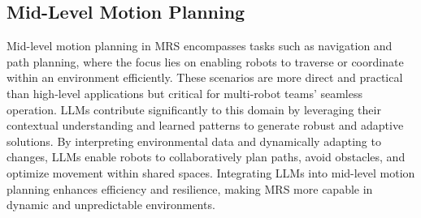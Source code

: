 \subsection{Mid-Level Motion Planning}
Mid-level motion planning in MRS encompasses tasks such as navigation and path planning, where the focus lies on enabling robots to traverse or coordinate within an environment efficiently. These scenarios are more direct and practical than high-level applications but critical for multi-robot teams' seamless operation. LLMs contribute significantly to this domain by leveraging their contextual understanding and learned patterns to generate robust and adaptive solutions. By interpreting environmental data and dynamically adapting to changes, LLMs enable robots to collaboratively plan paths, avoid obstacles, and optimize movement within shared spaces. Integrating LLMs into mid-level motion planning enhances efficiency and resilience, making MRS more capable in dynamic and unpredictable environments. 

